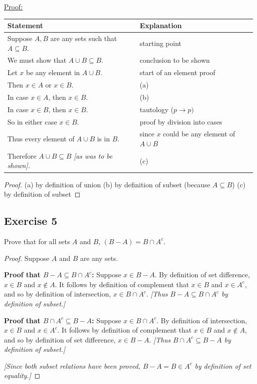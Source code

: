 \documentclass[14pt]{extarticle}
\newcommand{\fbl}{\underline{\hspace{1cm}}\,\,}
\newcommand{\cy}{\color{cyan}}
\begin{document}
\underline{Proof:}
\begin{center}
\begin{tabular}{|l|l|}
\hline
{\bf Statement} & {\bf Explanation} \\ 
\hline
Suppose $A, B$ are any sets such that \(A \subseteq B\). & starting point \\
\hline
We must show that \(A \cup B \subseteq B\). & conclusion to be shown \\
\hline
Let $x$ be any element in $A \cup B$. & start of an element proof \\
\hline
Then $x \in A$ or $x \in B$. & {\cy (a)} \fbl \\
\hline
In case $x \in A$, then $x \in B$. & {\cy (b)} \fbl \\
\hline
In case $x \in B$, then $x \in B$. & tautology ($p \to p)$ \\
\hline
So in either case $x \in B$. & proof by division into cases \\
\hline
Thus every element of $A \cup B$ is in $B$. & since $x$ could be any element of $A \cup B$ \\
\hline
Therefore \(A \cup B \subseteq B\) {\it [as was to be shown].} & {\cy (c)} \fbl \\
\hline
\end{tabular}
\end{center}

\begin{proof}
(a) by definition of union (b) by definition of subset (because \(A \subseteq B\)) (c) by definition of subset
\end{proof}

\subsection{Exercise 5}
Prove that for all sets $A$ and $B$, \((B - A) = B \cap A^c\).

\begin{proof}
Suppose $A$ and $B$ are any sets.

{\bf Proof that \(B - A \subseteq B \cap A^c\):} Suppose \(x \in B - A\). By definition of set difference, 
\(x \in B\) and \(x \notin A\). It follows by definition of complement that \(x \in B\) and \(x \in A^c\), and so by 
definition of intersection, \(x \in B \cap A^c\). {\it [Thus \(B - A \subseteq B \cap A^c\) by definition of subset.]}

{\bf Proof that \(B \cap A^c \subseteq B - A\):} Suppose \(x \in B \cap A^c\). By definition of intersection, 
\(x \in B\) and \(x \in A^c\). It follows by definition of complement that \(x \in B\) and \(x \notin A\), and so by 
definition of set difference, \(x \in B - A\). {\it [Thus \(B \cap A^c \subseteq B - A\) by definition of subset.]}

{\it [Since both subset relations have been proved, \(B - A = B \in A^c\) by definition of set equality.]}
\end{proof}
\end{document}
